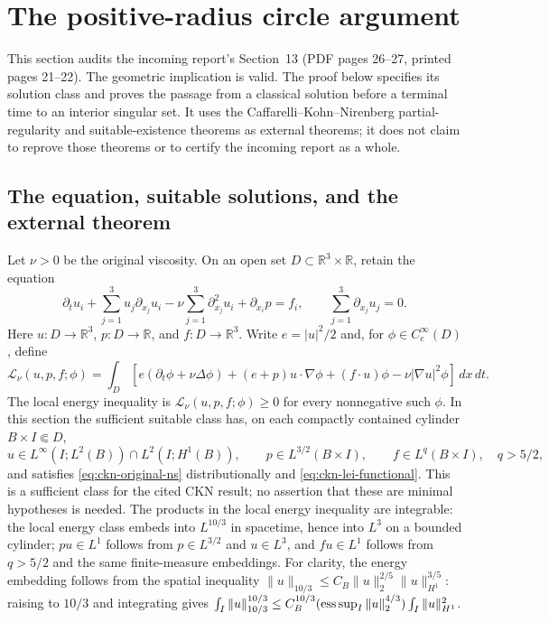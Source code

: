 \section{The positive-radius circle argument}
\label{sec:web-ckn-circle}

This section audits the incoming report's Section~13 (PDF pages 26--27,
printed pages 21--22). The geometric implication is valid. The proof below
specifies its solution class and proves the passage from a classical solution
before a terminal time to an interior singular set. It uses the
Caffarelli--Kohn--Nirenberg partial-regularity and suitable-existence theorems
as external theorems; it does not claim to reprove those theorems or to
certify the incoming report as a whole.

\subsection{The equation, suitable solutions, and the external theorem}

Let $\nu>0$ be the original viscosity. On an open set
$D\subset\mathbb R^3\times\mathbb R$, retain the equation
\begin{equation}\label{eq:ckn-original-ns}
 \partial_t u_i+\sum_{j=1}^3 u_j\partial_{x_j}u_i
 -\nu\sum_{j=1}^3\partial_{x_j}^2u_i+\partial_{x_i}p=f_i,
 \qquad \sum_{j=1}^3\partial_{x_j}u_j=0.
\end{equation}
Here $u:D\to\mathbb R^3$, $p:D\to\mathbb R$, and
$f:D\to\mathbb R^3$. Write $e=|u|^2/2$ and, for
$\phi\in C_c^\infty(D)$, define
\begin{equation}\label{eq:ckn-lei-functional}
 \mathcal L_\nu(u,p,f;\phi)=
 \int_D\left[e(\partial_t\phi+\nu\Delta\phi)
 +(e+p)u\cdot\nabla\phi+(f\cdot u)\phi
 -\nu|\nabla u|^2\phi\right]\,dx\,dt.
\end{equation}
The local energy inequality is $\mathcal L_\nu(u,p,f;\phi)\geq0$
for every nonnegative such $\phi$. In this section the sufficient suitable
class has, on each compactly contained cylinder $B\times I\Subset D$,
\begin{equation}\label{eq:ckn-integrability}
 u\in L^\infty(I;L^2(B))\cap L^2(I;H^1(B)),\qquad
 p\in L^{3/2}(B\times I),\qquad f\in L^q(B\times I),
 \quad q>5/2,
\end{equation}
and satisfies \eqref{eq:ckn-original-ns} distributionally and
\eqref{eq:ckn-lei-functional}. This is a sufficient class for the cited
CKN result; no assertion that these are minimal hypotheses is needed.
The products in the local energy inequality are integrable: the local
energy class embeds into $L^{10/3}$ in spacetime, hence into $L^3$ on a
bounded cylinder; $pu\in L^1$ follows from $p\in L^{3/2}$ and $u\in L^3$,
and $fu\in L^1$ follows from $q>5/2$ and the same finite-measure embeddings.
For clarity, the energy embedding follows from the spatial inequality
$\|u\|_{10/3}\leq C_B\|u\|_2^{2/5}\|u\|_{H^1}^{3/5}$:
raising to $10/3$ and integrating gives
$\int_I\|u\|_{10/3}^{10/3}\leq
C_B^{10/3}(\mathop{\rm ess\,sup}_I\|u\|_2^{4/3})
\int_I\|u\|_{H^1}^2$.

